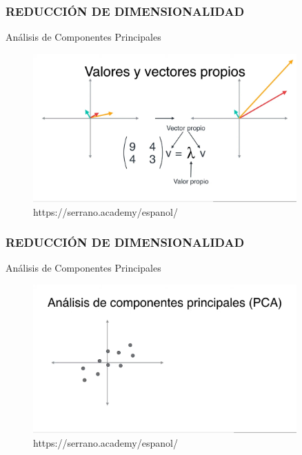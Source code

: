 \documentclass{beamer}
\begin{document}
\begin{frame}
	\frametitle{REDUCCIÓN DE DIMENSIONALIDAD}
	\begin{block}{Análisis de Componentes Principales}	
		\begin{figure}
			\includegraphics[width=0.9\textwidth]{PCA/IMG_3580.jpg}
			\caption{https://serrano.academy/espanol/}
		\end{figure}
	\end{block}
\end{frame}

\begin{frame}
	\frametitle{REDUCCIÓN DE DIMENSIONALIDAD}
	\begin{block}{Análisis de Componentes Principales}	
		\begin{figure}
			\includegraphics[width=0.9\textwidth]{PCA/IMG_3581.jpg}
			\caption{https://serrano.academy/espanol/}
		\end{figure}
	\end{block}
\end{frame}
\end{document}
